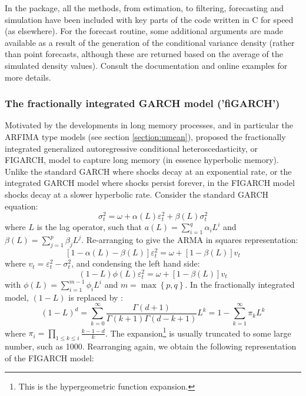 In the \verb@rugarch@ package, all the methods, from estimation, to filtering, forecasting and simulation have been included with key parts of the code written in C for speed (as elsewhere). For the forecast routine, some additional arguments are made available as a result of the generation of the conditional variance density (rather than point forecasts, although these are returned based on the average of the simulated density values). Consult the documentation and online examples for more details.

\subsubsection{The fractionally integrated GARCH model ('fiGARCH')}\label{section:figarch}
Motivated by the developments in long memory processes, and in particular the ARFIMA type models (see section \ref{section:umean}), \cite{Baillie1996} proposed the fractionally integrated generalized autoregressive conditional heteroscedasticity, or FIGARCH, model to capture long memory (in essence hyperbolic memory). Unlike the standard GARCH where shocks decay at an exponential rate, or the integrated GARCH model where shocks persist forever, in the FIGARCH model shocks decay at a slower hyperbolic rate.
Consider the standard GARCH equation:
\begin{equation}
\sigma _t^2 = \omega  + \alpha \left( L \right)\varepsilon _t^2 + \beta \left( L \right)\sigma _t^2
\end{equation}
where $L$ is the lag operator, such that $a\left( L \right) = \sum\limits_{i = 1}^q {{\alpha _i}{L^i}}$ and $\beta \left( L \right) = \sum\limits_{j = 1}^p {{\beta _j}{L^j}}$. Re-arranging to give the ARMA in squares representation:
\begin{equation}
\left[ {1 - \alpha \left( L \right) - \beta \left( L \right)} \right]\varepsilon _t^2 = \omega  + \left[ {1 - \beta \left( L \right)} \right]{v_t}
\end{equation}
where ${v_t} = \varepsilon _t^2 - \sigma _t^2$, and condensing the left hand side:
\begin{equation}
\left( {1 - L} \right)\phi \left( L \right)\varepsilon _t^2 = \omega  + \left[ {1 - \beta \left( L \right)} \right]{v_t}
\end{equation}
with $\phi \left( L \right) = \sum\limits_{i = 1}^{m - 1} {{\phi _i}{L^i}}$ and $m = \max \left\{ {p,q} \right\}$. In the fractionally integrated model, $\left(1-L\right)$ is replaced by :
\begin{equation}
{\left( {1 - L} \right)^d} = \sum\limits_{k = 0}^\infty  {\frac{{\Gamma \left( {d + 1} \right)}}{{\Gamma \left( {k + 1} \right)\Gamma \left( {d - k + 1} \right)}}{L^k} = } 1 - \sum\limits_{k = 1}^\infty  {{\pi _k}{L^k}}
\end{equation}
where ${\pi _i} = \prod\limits_{1 \le k \le i} {\frac{{k - 1 - d}}{k}}$. The expansion\footnote{This is the hypergeometric function expansion.} is usually truncated to some large number, such as 1000. Rearranging again, we obtain the following representation of the FIGARCH model:

